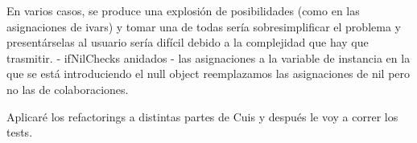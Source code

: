 En varios casos, se produce una explosión de posibilidades (como en las asignaciones de ivars) y
tomar una de todas sería sobresimplificar el problema y presentárselas al usuario sería
difícil debido a la complejidad que hay que trasmitir.
- ifNilChecks anidados
- las asignaciones a la variable de instancia en la que se está introduciendo el null object
reemplazamos las asignaciones de nil pero no las de colaboraciones.



Aplicaré los refactorings a distintas partes de Cuis y después le voy a correr los tests.